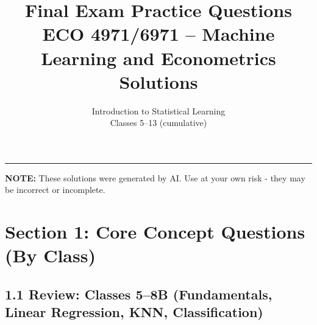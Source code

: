 \documentclass[11pt]{article}
\title{Final Exam Practice Questions\\[0.5em]
  \large ECO 4971/6971 -- Machine Learning and Econometrics\\[0.5em]
  \normalsize \textbf{Solutions}}
\author{Introduction to Statistical Learning\\Classes 5--13 (cumulative)}
\date{}
\begin{document}
\maketitle

\bigskip
\hrule
\bigskip

\textbf{NOTE: } These solutions were generated by AI. Use at your own risk - they may be incorrect or incomplete. 

\section*{Section 1: Core Concept Questions (By Class)}

\subsection*{1.1 Review: Classes 5--8B (Fundamentals, Linear Regression, KNN, Classification)}
\end{document}
